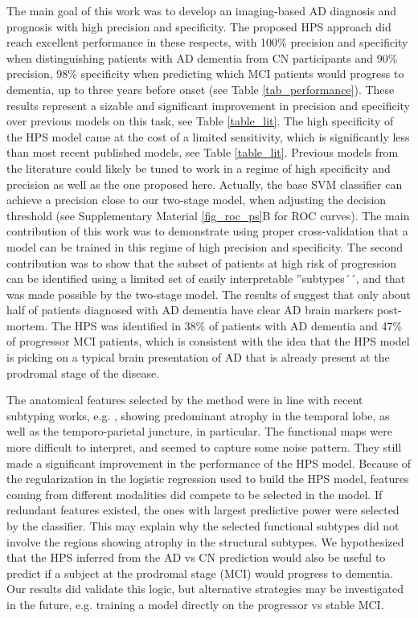 \documentclass[authoryear]{elsarticle}
\begin{document}
The main goal of this work was to develop an imaging-based AD diagnosis and prognosis with high precision and specificity. The proposed HPS approach did reach excellent performance in these respects, with 100\% precision and specificity when distinguishing patients with AD dementia from CN participants and 90\% precision, 98\% specificity when predicting which MCI patients would progress to dementia, up to three years before onset (see Table \ref{tab_performance}). These results represent a sizable and significant improvement in precision and specificity over previous models on this task, see Table \ref{table_lit}. The high specificity of the HPS model came at the cost of a limited sensitivity, which is significantly less than most recent published models, see Table \ref{table_lit}. Previous models from the literature could likely be tuned to work in a regime of high specificity and precision as well as the one proposed here. Actually, the base SVM classifier can achieve a precision close to our two-stage model, when adjusting the decision threshold (see Supplementary Material \ref{fig_roc_ps}B for ROC curves). The main contribution of this work was to demonstrate using proper cross-validation that a model can be trained in this regime of high precision and specificity. The second contribution was to show that the subset of patients at high risk of progression can be identified using a limited set of easily interpretable ''subtypes´´, and that was made possible by the two-stage model. The results of \citep{Beach2012} suggest that only about half of patients diagnosed with AD dementia have clear AD brain markers post-mortem. The HPS was identified in 38\% of patients with AD dementia and 47\% of progressor MCI patients, which is consistent with the idea that the HPS model is picking on a typical brain presentation of AD that is already present at the prodromal stage of the disease.

The anatomical features selected by the method were in line with recent subtyping works, e.g. \citep{Hwang2015}, showing predominant atrophy in the temporal lobe, as well as the temporo-parietal juncture, in particular. The functional maps were more difficult to interpret, and seemed to capture some noise pattern. They still made a significant improvement in the performance of the HPS model. Because of the regularization in the logistic regression used to build the HPS model, features coming from different modalities did compete to be selected in the model. If redundant features existed, the ones with largest predictive power were selected by the classifier. This may explain why the selected functional subtypes did not involve the regions showing atrophy in the structural subtypes. We hypothesized that the HPS inferred from the AD vs CN prediction would also be useful to predict if a subject at the prodromal stage (MCI) would progress to dementia. Our results did validate this logic, but alternative strategies may be investigated in the future, e.g. training a model directly on the progressor vs stable MCI. 
\end{document}
